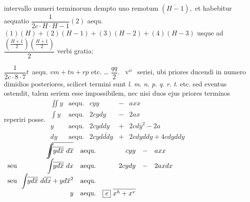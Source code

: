 intervallo numeri terminorum\protect{}
dempto uno remotum $(\overline{H-1}),$
et habebitur aequatio
%
$\dfrac{1}{2c \cdot H \cdot H-1}(2)$ aequ. $(1)(H) + (2)(H-1) + (3)(H-2) + 
(4)(H-3)$ 
usque ad $\displaystyle\dfrac{\left(\displaystyle\frac{\overline{H+1}}{2}\right)
\left(\displaystyle\frac{\overline{H+1}}{2}\right)}{2}$
%
verbi gratia:\rule[-4mm]{0pt}{16,0mm}
%
$\dfrac{1}{2c \cdot 8 \cdot 7}t$\, aequ. $vm + tn + rp$ etc. … $\dfrac{qq}{2}.$
%
~v\textsuperscript{o}\rbrack\ %
%
\pend
\vspace{2mm}
%
%
\pstart
{}
% 
seriei,\protect{} ubi 
%
%
priores ducendi in numero dimidios posteriores,
scilicet termini sunt 
\textit{l}. \textit{m}. \textit{n}. \textit{p}. \textit{q}. \textit{r}. \textit{t}. etc.
sed eventus\protect{} ostendit,
talem seriem esse impossibilem,\protect{}
nec nisi duos ejus priores terminos reperiri posse.%
\protect{}
\pend
%
\newpage
%
%
\pstart
\centering
\renewcommand{\arraystretch}{1.5}
\setlength{\arraycolsep}{3pt}
$\begin{array}{rcrcl}
\!\!\displaystyle\iint\!\!\!y & \text{aequ.} & cyy & - & axx \\ 
\!\!\displaystyle\int\!\!\!y & \text{aequ.} & 2cydy & - & 2ax \\ 
 y & \text{aequ.} & 2cyddy & + & 2cd\overline{y}^2 - 2a \\ 
dy & \text{aequ.} & 2cy\overline{dddy} & + & 2cdyddy + 4cdyddy
\end{array}$
\setlength{\arraycolsep}{3pt}
$\begin{array}{lrcrcl}
& \!\!\displaystyle\int\!\!\overline{\!\!\!\!\displaystyle\int\!\!\overline{yd\overline{x}}\ d\overline{x}} & \text{aequ.} & cyy & - & axx \\
\text{seu} & \!\!\displaystyle\int\!\!\overline{yd\overline{x}}\ dx & \text{aequ.} & 2cydy & - & 2axdx \\
\text{seu} & \!\!\displaystyle\int\!\!\overline{yd\overline{x}}\ d\overline{dx} + yd\overline{x}^2 & \text{aequ.} & & & \\
& y & \text{aequ.} & \protect\framebox{\textit{e}}\ \overline{x^h + x^v} &&
\end{array}$
